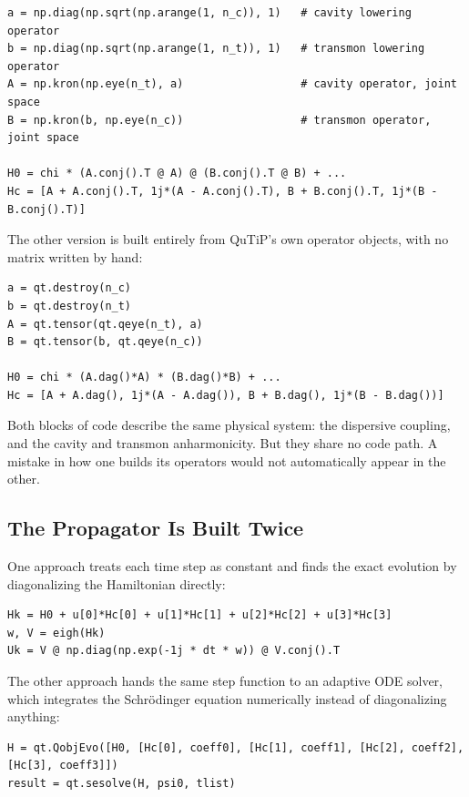 \documentclass[11pt]{article}
\begin{document}
\begin{lstlisting}
a = np.diag(np.sqrt(np.arange(1, n_c)), 1)   # cavity lowering operator
b = np.diag(np.sqrt(np.arange(1, n_t)), 1)   # transmon lowering operator
A = np.kron(np.eye(n_t), a)                  # cavity operator, joint space
B = np.kron(b, np.eye(n_c))                  # transmon operator, joint space

H0 = chi * (A.conj().T @ A) @ (B.conj().T @ B) + ...
Hc = [A + A.conj().T, 1j*(A - A.conj().T), B + B.conj().T, 1j*(B - B.conj().T)]
\end{lstlisting}

The other version is built entirely from QuTiP's own operator objects, with no matrix written by
hand:

\begin{lstlisting}
a = qt.destroy(n_c)
b = qt.destroy(n_t)
A = qt.tensor(qt.qeye(n_t), a)
B = qt.tensor(b, qt.qeye(n_c))

H0 = chi * (A.dag()*A) * (B.dag()*B) + ...
Hc = [A + A.dag(), 1j*(A - A.dag()), B + B.dag(), 1j*(B - B.dag())]
\end{lstlisting}

Both blocks of code describe the same physical system: the dispersive coupling, and the cavity
and transmon anharmonicity. But they share no code path. A mistake in how one builds its operators
would not automatically appear in the other.

\subsection{The Propagator Is Built Twice}

One approach treats each time step as constant and finds the exact evolution by diagonalizing the
Hamiltonian directly:

\begin{lstlisting}
Hk = H0 + u[0]*Hc[0] + u[1]*Hc[1] + u[2]*Hc[2] + u[3]*Hc[3]
w, V = eigh(Hk)
Uk = V @ np.diag(np.exp(-1j * dt * w)) @ V.conj().T
\end{lstlisting}

The other approach hands the same step function to an adaptive ODE solver, which integrates the
Schr\"odinger equation numerically instead of diagonalizing anything:

\begin{lstlisting}
H = qt.QobjEvo([H0, [Hc[0], coeff0], [Hc[1], coeff1], [Hc[2], coeff2], [Hc[3], coeff3]])
result = qt.sesolve(H, psi0, tlist)
\end{lstlisting}
\end{document}
